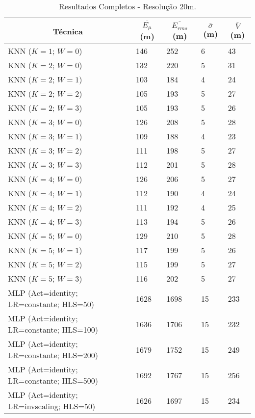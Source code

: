 \begin{center}
\begin{longtable}{|l|l|l|l|l|}
\caption{Resultados Completos - Resolução 20m.} 
\label{table:resultsComplete20m} \\
\hline \multicolumn{1}{|c|}{\textbf{Técnica}} & \multicolumn{1}{c|}{\textbf{$\overline{E_{\mu}}$ (m)}} & \multicolumn{1}{c|}{\textbf{$\overline{E_{rms}}$ (m)}} & \multicolumn{1}{c|}{\textbf{$\overline{\sigma}$ (m)}} & \multicolumn{1}{c|}{\textbf{$\overline{V}$ (m)}} \\ \hline 
\endfirsthead
\hline
\endlastfoot
KNN ($K=1$; $W=0$) & 146 & 252 & 6 & 43 \\
KNN ($K=2$; $W=0$) & 132 & 220 & 5 & 31 \\
KNN ($K=2$; $W=1$) & 103 & 184 & 4 & 24 \\
KNN ($K=2$; $W=2$) & 105 & 193 & 5 & 27 \\
KNN ($K=2$; $W=3$) & 105 & 193 & 5 & 26 \\
KNN ($K=3$; $W=0$) & 126 & 208 & 5 & 28 \\
KNN ($K=3$; $W=1$) & 109 & 188 & 4 & 23 \\
KNN ($K=3$; $W=2$) & 111 & 198 & 5 & 27 \\
KNN ($K=3$; $W=3$) & 112 & 201 & 5 & 28 \\
KNN ($K=4$; $W=0$) & 126 & 206 & 5 & 27 \\
KNN ($K=4$; $W=1$) & 112 & 190 & 4 & 24 \\
KNN ($K=4$; $W=2$) & 111 & 192 & 4 & 25 \\
KNN ($K=4$; $W=3$) & 113 & 194 & 5 & 26 \\
KNN ($K=5$; $W=0$) & 129 & 210 & 5 & 28 \\
KNN ($K=5$; $W=1$) & 117 & 199 & 5 & 26 \\
KNN ($K=5$; $W=2$) & 115 & 199 & 5 & 27 \\
KNN ($K=5$; $W=3$) & 116 & 202 & 5 & 27 \\
MLP (Act=identity; LR=constante; HLS=50) & 1628 & 1698 & 15 & 233 \\
MLP (Act=identity; LR=constante; HLS=100) & 1636 & 1706 & 15 & 232 \\
MLP (Act=identity; LR=constante; HLS=200) & 1679 & 1752 & 15 & 249 \\
MLP (Act=identity; LR=constante; HLS=500) & 1692 & 1767 & 15 & 256 \\
MLP (Act=identity; LR=invscaling; HLS=50) & 1626 & 1697 & 15 & 234 \\

\end{longtable}
\end{center}
